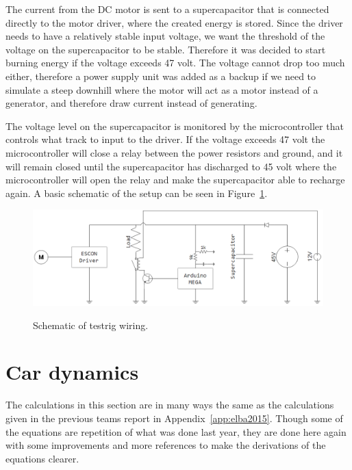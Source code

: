 The current from the DC motor is sent to a supercapacitor that is connected
directly to the motor driver, where the created energy is stored. Since the
driver needs to have a relatively stable input voltage, we want the threshold
of the voltage on the supercapacitor to be stable. Therefore it was decided to
start burning energy if the voltage exceeds 47 volt. The voltage cannot drop
too much either, therefore a power supply unit was added as a backup if we need
to simulate a steep downhill where the motor will act as a motor instead of a
generator, and therefore draw current instead of generating. 

The voltage level on the supercapacitor is monitored by the microcontroller
that controls what track to input to the driver. If the voltage exceeds 47 volt
the microcontroller will close a relay between the power resistors and ground,
and it will remain closed until the supercapacitor has discharged to 45 volt where
the microcontroller will open the relay and make the supercapacitor able to
recharge again. A basic schematic of the setup can be seen in
Figure~\ref{fig:testrig_schematic}.

\begin{figure}[H]
    \centering\label{fig:testrig_schematic}
    \includegraphics[width=\textwidth]{./img/testrig_schematic.png}
    \caption{Schematic of testrig wiring.}
\end{figure}

\section{Car dynamics}\label{sec:cardynamics}
The calculations in this section are in many ways the same as the calculations
given in the previous teams report in Appendix~\ref{app:elba2015}. Though some
of the equations are repetition of what was done last year, they are
done here again with some improvements and more references to make the
derivations of the equations clearer.

